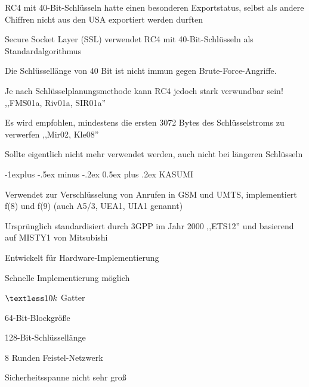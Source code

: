 \documentclass[a4paper]{article}
\makeatletter
\renewcommand{\subsection}{\@startsection{subsection}{2}{0mm}%
 {-1explus -.5ex minus -.2ex}%
 {0.5ex plus .2ex}%
 {\normalfont\normalsize\bfseries}}
\makeatother
\begin{document}
\begin{multicols}{3}
\begin{itemize*}
\begin{itemize*}
            \end{itemize*}
            \item RC4 mit 40-Bit-Schlüsseln hatte einen besonderen Exportstatus, selbst als andere Chiffren nicht aus den USA exportiert werden durften
            \begin{itemize*}
                  \item Secure Socket Layer (SSL) verwendet RC4 mit 40-Bit-Schlüsseln als Standardalgorithmus
                  \item Die Schlüssellänge von 40 Bit ist nicht immun gegen Brute-Force-Angriffe.
            \end{itemize*}
            \item Je nach Schlüsselplanungsmethode kann RC4 jedoch stark verwundbar sein! ,,FMS01a, Riv01a, SIR01a''
            \item Es wird empfohlen, mindestens die ersten 3072 Bytes des Schlüsselstroms zu verwerfen ,,Mir02, Kle08''
            \item Sollte eigentlich nicht mehr verwendet werden, auch nicht bei längeren Schlüsseln
      \end{itemize*}


      \subsection{KASUMI}
      \begin{itemize*}
            \item Verwendet zur Verschlüsselung von Anrufen in GSM und UMTS, implementiert f(8) und f(9) (auch A5/3, UEA1, UIA1 genannt)
            \item Ursprünglich standardisiert durch 3GPP im Jahr 2000 ,,ETS12'' und basierend auf MISTY1 von Mitsubishi
            \item Entwickelt für Hardware-Implementierung
            \begin{itemize*}
                  \item Schnelle Implementierung möglich
                  \item $\textless10k$ Gatter
            \end{itemize*}
            \item 64-Bit-Blockgröße
            \item 128-Bit-Schlüssellänge
            \item 8 Runden Feistel-Netzwerk
            \item Sicherheitsspanne nicht sehr groß
      \end{itemize*}


\end{multicols}
\end{document}
